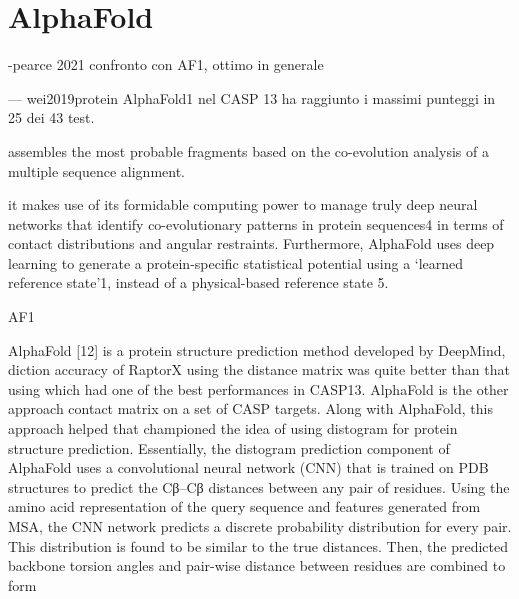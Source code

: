 \chapter{AlphaFold}
-pearce 2021 confronto con AF1, ottimo in generale

--- wei2019protein
AlphaFold1 nel CASP 13 ha raggiunto i massimi punteggi in 25 dei 43 test.

assembles the most probable
fragments based on the co-evolution
analysis of a multiple sequence alignment.

it makes
use of its formidable computing power
to manage truly deep neural networks
that identify co-evolutionary patterns in
protein sequences4 in terms of contact
distributions and angular restraints.
Furthermore, AlphaFold uses deep
learning to generate a protein-specific
statistical potential using a ‘learned
reference state’1, instead of a physical-based
reference state 5.

AF1

AlphaFold  [12] is a protein structure  prediction  method  developed  by  DeepMind, diction  accuracy  of RaptorX  using  the distance  matrix  was quite better than  that using which  had  one  of  the  best  performances  in  CASP13.  AlphaFold  is  the  other  approach contact matrix on a set of CASP targets. Along with AlphaFold, this approach  helped that championed the idea of using distogram for protein structure prediction. Essentially, the distogram prediction component of AlphaFold uses a convolutional neural network (CNN) that is trained on PDB structures to predict the Cβ–Cβ distances between any pair of residues. Using the amino acid representation of the query sequence and features generated from MSA, the CNN network predicts a discrete probability distribution for every pair. This distribution is found to be similar to the true distances. Then, the predicted backbone torsion angles and pair-wise distance between residues are combined to form \supercite{pakhrin2021deep}


\clearpage